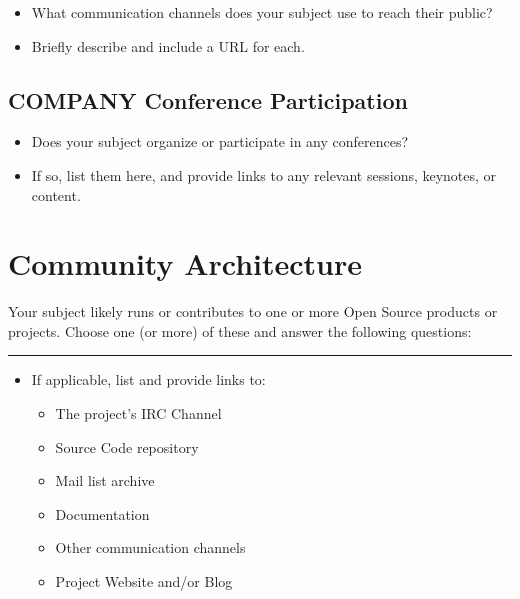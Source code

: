 \begin{itemize}
\itemsep1pt\parskip0pt
\item
  What communication channels does your subject use to reach their
  public?
\item
  Briefly describe and include a URL for each.
\end{itemize}

\subsection{COMPANY Conference
Participation}\label{company-conference-participation}

\begin{itemize}
\itemsep1pt\parskip0pt
\item
  Does your subject organize or participate in any conferences?
\item
  If so, list them here, and provide links to any relevant sessions,
  keynotes, or content.
\end{itemize}

\section{Community Architecture}\label{community-architecture}

Your subject likely runs or contributes to one or more Open Source
products or projects. Choose one (or more) of these and answer the
following questions:

\begin{center}\rule{3in}{0.4pt}\end{center}

\begin{itemize}
\itemsep1pt\parskip0pt
\item
  If applicable, list and provide links to:

  \begin{itemize}
  \itemsep1pt\parskip0pt
  \item
    The project's IRC Channel
  \item
    Source Code repository
  \item
    Mail list archive
  \item
    Documentation
  \item
    Other communication channels
  \item
    Project Website and/or Blog
  \end{itemize}
\end{itemize}

